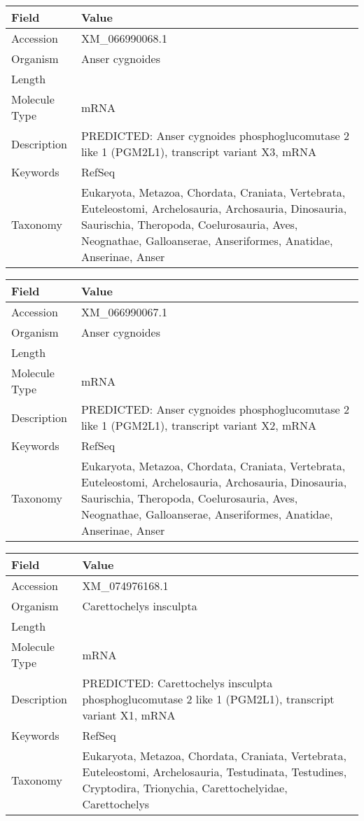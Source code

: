 \documentclass[10pt]{article}
\begin{document}
\vspace{1em}
{\footnotesize
\begin{longtable}{>{\raggedright\arraybackslash}p{4.5cm} >{\raggedright\arraybackslash}p{11.5cm}}
\textbf{Field} & \textbf{Value} \\
\hline
Accession & XM\_066990068.1 \\
Organism & Anser cygnoides \\
Length & 6268 \\
Molecule Type & mRNA \\
Description & PREDICTED: Anser cygnoides phosphoglucomutase 2 like 1 (PGM2L1), transcript variant X3, mRNA \\
Keywords & RefSeq \\
Taxonomy & Eukaryota, Metazoa, Chordata, Craniata, Vertebrata, Euteleostomi, Archelosauria, Archosauria, Dinosauria, Saurischia, Theropoda, Coelurosauria, Aves, Neognathae, Galloanserae, Anseriformes, Anatidae, Anserinae, Anser \\
\end{longtable}
}

\vspace{1em}
{\footnotesize
\begin{longtable}{>{\raggedright\arraybackslash}p{4.5cm} >{\raggedright\arraybackslash}p{11.5cm}}
\textbf{Field} & \textbf{Value} \\
\hline
Accession & XM\_066990067.1 \\
Organism & Anser cygnoides \\
Length & 6342 \\
Molecule Type & mRNA \\
Description & PREDICTED: Anser cygnoides phosphoglucomutase 2 like 1 (PGM2L1), transcript variant X2, mRNA \\
Keywords & RefSeq \\
Taxonomy & Eukaryota, Metazoa, Chordata, Craniata, Vertebrata, Euteleostomi, Archelosauria, Archosauria, Dinosauria, Saurischia, Theropoda, Coelurosauria, Aves, Neognathae, Galloanserae, Anseriformes, Anatidae, Anserinae, Anser \\
\end{longtable}
}

\vspace{1em}
{\footnotesize
\begin{longtable}{>{\raggedright\arraybackslash}p{4.5cm} >{\raggedright\arraybackslash}p{11.5cm}}
\textbf{Field} & \textbf{Value} \\
\hline
Accession & XM\_074976168.1 \\
Organism & Carettochelys insculpta \\
Length & 7568 \\
Molecule Type & mRNA \\
Description & PREDICTED: Carettochelys insculpta phosphoglucomutase 2 like 1 (PGM2L1), transcript variant X1, mRNA \\
Keywords & RefSeq \\
Taxonomy & Eukaryota, Metazoa, Chordata, Craniata, Vertebrata, Euteleostomi, Archelosauria, Testudinata, Testudines, Cryptodira, Trionychia, Carettochelyidae, Carettochelys \\
\end{longtable}
}
\end{document}
